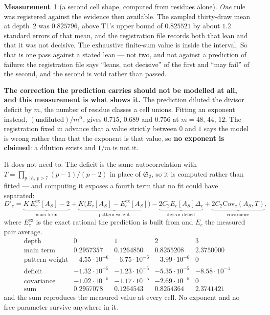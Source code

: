 \documentclass[11pt,a4paper]{article}
\theoremstyle{plain}
\theoremstyle{definition}
\newtheorem{measurement}[theorem]{Measurement}
\theoremstyle{remark}
\renewcommand{\SS}{\mathfrak{S}}
\begin{document}
\begin{measurement}[a second cell shape, computed from residues alone]
\emph{One} rule was registered against the evidence then available.
The sampled thirty-draw mean at depth~$2$ was $0.825796$, above T1's
upper bound of $0.825521$ by about $1.2$ standard errors of that mean,
and the registration file records both that lean and that it was not
decisive. The exhaustive finite-sum value is inside the interval. So that is one pass
against a stated lean --- not two, and not against a prediction of
failure: the registration file says ``leans, not decisive'' of the first and
``may fail'' of the second, and the second is void rather than passed.

\textbf{The correction the prediction carries should not be modelled at
all, and this measurement is what shows it.} The prediction diluted the
divisor deficit by $m$, the number of residue classes a cell unions.
Fitting an exponent instead, $(\text{undiluted})/m^{\alpha}$, gives
$0.715$, $0.689$ and $0.756$ at $m=48,\,44,\,12$. The registration
fixed in advance that a value strictly between $0$ and $1$ says the
model is wrong rather than that the exponent is that value, so
\textbf{no exponent is claimed}: a dilution exists and $1/m$ is not
it.

It does not need to. The deficit is the same autocorrelation with
$T=\prod_{p\mid h,\,p>7}(p-1)/(p-2)$ in place of $\SS_2$, so it is
computed rather than fitted --- and computing it exposes a fourth term
that no fit could have separated:
\[
  D'_c=\underbrace{K\,E^{\mathrm{ex}}_{c}[A_S]-2}_{\text{main term}}
        +\underbrace{K\bigl(E_c[A_S]-E^{\mathrm{ex}}_{c}[A_S]\bigr)}
          _{\text{pattern weight}}
        -\underbrace{2C_2E_c[A_S]\Delta_c}_{\text{divisor deficit}}
        +\underbrace{2C_2\mathrm{Cov}_c(A_S,T)}_{\text{covariance}},
\]
where $E^{\mathrm{ex}}_c$ is the exact rational the prediction is built
from and $E_c$ the measured pair average.
\[
\begin{array}{r|cccc}
 \text{depth} & 0 & 1 & 2 & 3\\\hline
 \text{main term} & 0.2957357 & 0.1264850 & 0.8255208 & 2.3750000\\
 \text{pattern weight} & -4.55\cdot10^{-6} & -6.75\cdot10^{-6}
   & -3.99\cdot10^{-6} & 0\\
 \text{deficit} & -1.32\cdot10^{-5} & -1.23\cdot10^{-5}
   & -5.35\cdot10^{-5} & -8.58\cdot10^{-4}\\
 \text{covariance} & -1.02\cdot10^{-5} & -1.17\cdot10^{-5}
   & -2.69\cdot10^{-5} & 0\\
 \text{sum} & 0.2957078 & 0.1264543 & 0.8254364 & 2.3741421
\end{array}
\]
and the sum reproduces the measured value at every cell. No exponent
and no free parameter survive anywhere in it.


\end{measurement}
\end{document}
